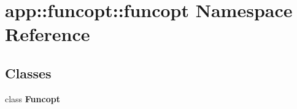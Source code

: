 \section{app::funcopt::funcopt Namespace Reference}
\label{namespaceapp_1_1funcopt_1_1funcopt}


\subsection*{Classes}
\begin{CompactItemize}
\item 
class {\bf Funcopt}
\end{CompactItemize}
